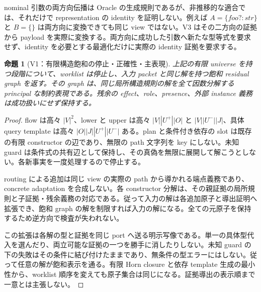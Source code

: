 \documentclass[11pt,a4paper]{article}
\newtheorem{theorem}{命題}[section]
\theoremstyle{remark}
\begin{document}
nominal 引数の両方向伝播は Oracle の生成規則であるが、非推移的な適合では、それだけで representation の identity を証明しない。例えば $A=\{foo?:str\}$ と $B=\{\}$ は両方向に変換できても同じ view ではない。V3 はその二方向の証拠から payload を実際に変換する。両方向に成功した引数へ新たな型等式を要求せず、identity を必要とする最適化だけに実際の identity 証拠を要求する。

\begin{theorem}[V1：有限構造飽和の停止・正確性・主表現]
上記の有限 universe を持つ段階について、worklist は停止し、入力 packet と同じ解を持つ飽和 residual graph を返す。その graph は、同じ局所構造規則の解を全て因数分解する principal な制約表現である。残余の effect、role、presence、外部 instance 義務は成功扱いにせず保持する。
\end{theorem}
\begin{proof}
flow は高々 $|V|^2$、lower と upper は高々 $|V||U^+||O|$ と $|V||U^-||J|$、具体 query template は高々 $|O||J||U^+||U^-|$ ある。plan と条件付き依存の slot は既存の有限 constructor の辺であり、無限の path 文字列を key にしない。未知 guard は条件式の共有辺として保持し、その真偽を無限に展開して解こうとしない。各新事実を一度処理するので停止する。

routing による追加は同じ view の実際の path から導かれる端点義務であり、concrete adaptation を合成しない。各 constructor 分解は、その親証拠の局所規則と子証拠・残余義務の対応である。従って入力の解は各追加原子と導出証明へ拡張でき、飽和 graph の解を制限すれば入力の解になる。全ての元原子を保持するため逆方向で検査が失われない。

この拡張は各解の型と証拠を同じ port へ送る明示写像である。単一の具体型代入を選んだり、両立可能な証拠の一つを勝手に消したりしない。未知 guard の下の失敗はその条件に結び付けたままであり、無条件の型エラーにはしない。従って任意の解が飽和表示を通る。有限 Horn closure と依存 template 生成の最小性から、worklist 順序を変えても原子集合は同じになる。証拠導出の表示順まで一意とは主張しない。
\end{proof}
\end{document}

